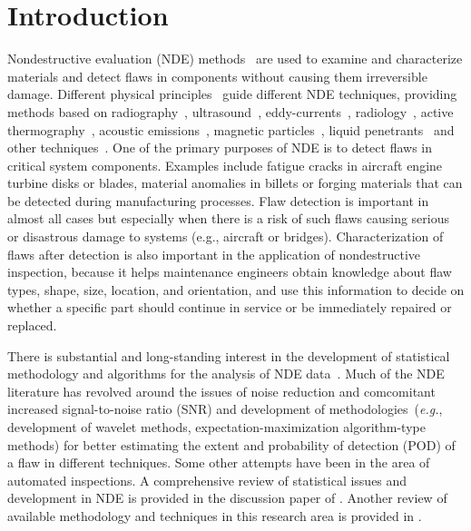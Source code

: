 \documentclass[12pt]{article}
\begin{document}
\section{Introduction}
Nondestructive evaluation (NDE)
methods~\citep{brayandstanley96,shull02,heller12} are used to examine
and characterize materials  and detect flaws in components without
causing them irreversible damage. Different physical
principles~\citep{rummel83,silketal87,brayandmcbride92} guide
different NDE techniques, providing methods based on
radiography~\citep{halmshaw82,halmshaw91},
ultrasound~\citep{krautkramerandkrautkramer90},
eddy-currents~\citep{kahnetal77,collinsetal85,yangetal10},
radiology~\citep{martzetal02}, active
thermography~\citep{spicerandosiander02}, acoustic 
emissions~\citep{prosser02}, magnetic particles~\citep{lindgrenetal02},
liquid penetrants~\citep{halmshaw91} and other
techniques~\citep{shull02,heller12}. One 
of the primary purposes of NDE is to detect flaws in critical system
components. Examples include fatigue cracks in aircraft engine turbine
disks  or blades, material anomalies in billets or forging materials
that can be detected  during manufacturing processes. Flaw detection
is important in almost all cases  but especially when there is a risk
of such flaws causing serious or disastrous  damage to systems
(e.g., aircraft or bridges).  Characterization of flaws after
detection is also important in the application of nondestructive
inspection, because it helps maintenance engineers obtain
knowledge about flaw types, shape, size, location, and
orientation, and use this information to decide on
whether a specific part should continue in service or be immediately
repaired or replaced.

There is substantial and long-standing interest in the development of
statistical methodology and algorithms for the analysis of
NDE data~\citep[{\em e.g.}, see][]{berensandhovey81,berensandhovey82,berensandhovey83,
berensandhovey84,grayandthompson86,annisanderland89,burkeletal96,hoveyandberens88,perdijon88a,perdijon88b,perdijon89,nealandspeckman93,howardandgilmore94,sweeting95,spencerandschurman95,olinandmeeker96,howardetal98,aokiandsuga99,zakietal01,legendreetal01,meyerandcandy02,zavaljevskietal05,dogandzicandzhang07,hasanzadehetal08,liandmeeker09,lietal10,gaoandmeeker12,ngetal13}. Much
of the NDE literature has revolved around the issues of noise
reduction and comcomitant increased signal-to-noise ratio (SNR)  and
development of methodologies~({\em e.g.}, development of wavelet methods,
expectation-maximization algorithm-type methods) for better estimating
the extent and probability of detection (POD) of a flaw in different 
techniques. Some other attempts have been in the area of automated
inspections. A comprehensive review of statistical issues and
development in NDE is provided in the discussion paper of
\citet{olinandmeeker96}. Another review of available
methodology and techniques in this research area is provided in
\citet{milhdbk09}. 
\end{document}
